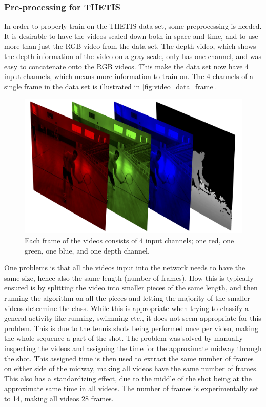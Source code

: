 \subsubsection{Pre-processing for THETIS}
In order to properly train on the THETIS data set, some preprocessing is needed. It is desirable to have the videos scaled down both in space and time, and to use more than just the RGB video from the data set. The depth video, which shows the depth information of the video on a gray-scale, only has one channel, and was easy to concatenate onto the RGB videos. This make the data set now have 4 input channels, which means more information to train on. The 4 channels of a single frame in the data set is illustrated in \autoref{fig:video_data_frame}. 
\begin{figure}
    \centering
    \includegraphics[width=.9\linewidth]{Pics/04_Data/RGBD.png}
    \caption{Each frame of the videos consists of 4 input channels; one red, one green, one blue, and one depth channel.}
    \label{fig:video_data_frame}
\end{figure}

One problems is that all the videos input into the network needs to have the same size, hence also the same length (number of frames). How this is typically ensured is by splitting the video into smaller pieces of the same length, and then running the algorithm on all the pieces and letting the majority of the smaller videos determine the class.\cite{Karpathy2014} While this is appropriate when trying to classify a general activity like running, swimming etc., it does not seem appropriate for this problem. This is due to the tennis shots being performed once per video, making the whole sequence a part of the shot. The problem was solved by manually inspecting the videos and assigning the time for the approximate midway through the shot. This assigned time is then used to extract the same number of frames on either side of the midway, making all videos have the same number of frames. This also has a standardizing effect, due to the middle of the shot being at the approximate same time in all videos. The number of frames is experimentally set to 14, making all videos 28 frames.

